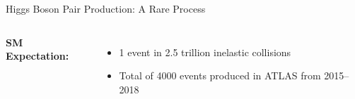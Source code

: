 \documentclass[11pt, xcolor={dvipsnames}, aspectratio=169]{beamer}
\begin{document}
\begin{frame}{Higgs Boson Pair Production: A Rare Process}
\begin{columns}

    \textbf{SM Expectation:}
    \vspace{0.5em}
    \begin{itemize}
      \setlength{\itemsep}{1em}

    \item 1 \HH event in 2.5 trillion inelastic collisions

    \item Total of 4000 \HH events produced in ATLAS from 2015--2018


    \end{itemize}
  \end{columns}
\end{frame}

\end{document}

